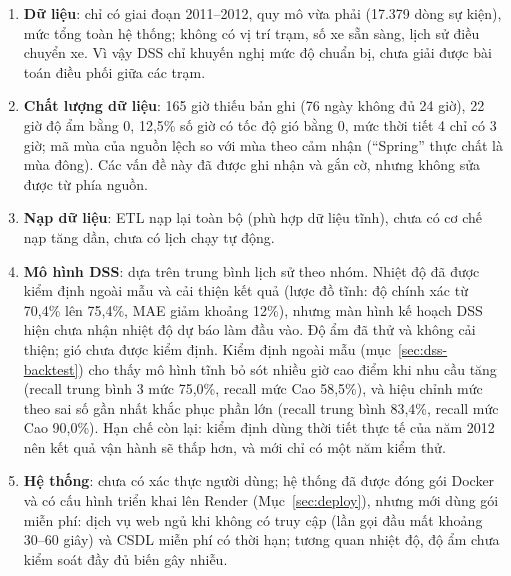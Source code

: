 \newpage
{}\label{sec:limits}

\begin{enumerate}
    \item \textbf{Dữ liệu}: chỉ có giai đoạn 2011--2012, quy mô vừa phải (17.379 dòng sự kiện), mức tổng toàn hệ thống; không có vị trí trạm, số xe sẵn sàng, lịch sử điều chuyển xe. Vì vậy DSS chỉ khuyến nghị mức độ chuẩn bị, chưa giải được bài toán điều phối giữa các trạm.
    \item \textbf{Chất lượng dữ liệu}: 165 giờ thiếu bản ghi (76 ngày không đủ 24 giờ), 22 giờ độ ẩm bằng 0, 12,5\% số giờ có tốc độ gió bằng 0, mức thời tiết 4 chỉ có 3 giờ; mã mùa của nguồn lệch so với mùa theo cảm nhận (``Spring'' thực chất là mùa đông). Các vấn đề này đã được ghi nhận và gắn cờ, nhưng không sửa được từ phía nguồn.
    \item \textbf{Nạp dữ liệu}: ETL nạp lại toàn bộ (phù hợp dữ liệu tĩnh), chưa có cơ chế nạp tăng dần, chưa có lịch chạy tự động.
    \item \textbf{Mô hình DSS}: dựa trên trung bình lịch sử theo nhóm. Nhiệt độ đã được kiểm định ngoài mẫu và cải thiện kết quả (lược đồ tĩnh: độ chính xác từ 70,4\% lên 75,4\%, MAE giảm khoảng 12\%), nhưng màn hình kế hoạch DSS hiện chưa nhận nhiệt độ dự báo làm đầu vào. Độ ẩm đã thử và không cải thiện; gió chưa được kiểm định. Kiểm định ngoài mẫu (mục~\ref{sec:dss-backtest}) cho thấy mô hình tĩnh bỏ sót nhiều giờ cao điểm khi nhu cầu tăng (recall trung bình 3 mức 75,0\%, recall mức Cao 58,5\%), và hiệu chỉnh mức theo sai số gần nhất khắc phục phần lớn (recall trung bình 83,4\%, recall mức Cao 90,0\%). Hạn chế còn lại: kiểm định dùng thời tiết thực tế của năm 2012 nên kết quả vận hành sẽ thấp hơn, và mới chỉ có một năm kiểm thử.
    \item \textbf{Hệ thống}: chưa có xác thực người dùng; hệ thống đã được đóng gói Docker và có cấu hình triển khai lên Render (Mục~\ref{sec:deploy}), nhưng mới dùng gói miễn phí: dịch vụ web ngủ khi không có truy cập (lần gọi đầu mất khoảng 30--60 giây) và CSDL miễn phí có thời hạn; tương quan nhiệt độ, độ ẩm chưa kiểm soát đầy đủ biến gây nhiễu.
\end{enumerate}

